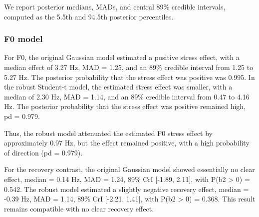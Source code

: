 \documentclass[
  english,
  man,floatsintext]{apa6}
\begin{document}
We report posterior medians, MADs, and central 89\% credible intervals, computed as the 5.5th and 94.5th posterior percentiles.

\subsubsection{F0 model}\label{f0-model}

For F0, the original Gaussian model estimated a positive stress effect, with a median effect of 3.27 Hz, MAD = 1.25, and an 89\% credible interval from 1.25 to 5.27 Hz. The posterior probability that the stress effect was positive was 0.995. In the robust Student-t model, the estimated stress effect was smaller, with a median of 2.30 Hz, MAD = 1.14, and an 89\% credible interval from 0.47 to 4.16 Hz. The posterior probability that the stress effect was positive remained high, pd = 0.979.

Thus, the robust model attenuated the estimated F0 stress effect by approximately 0.97 Hz, but the effect remained positive, with a high probability of direction (pd = 0.979).

For the recovery contrast, the original Gaussian model showed essentially no clear effect, median = 0.14 Hz, MAD = 1.24, 89\% CrI {[}-1.89, 2.11{]}, with P(b2 \textgreater{} 0) = 0.542. The robust model estimated a slightly negative recovery effect, median = -0.39 Hz, MAD = 1.14, 89\% CrI {[}-2.21, 1.41{]}, with P(b2 \textgreater{} 0) = 0.368. This result remains compatible with no clear recovery effect.

\begin{table}[!h]
\centering
\caption{\label{tab:table-f0-main-effects-robust}Comparison of Gaussian and robust Student-t main-effects models for F0.}
\centering
{}
\end{table}
\end{document}
